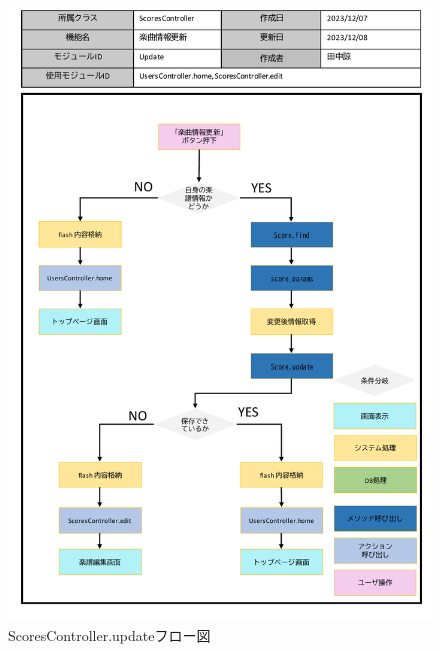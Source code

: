\begin{figure}
    \centering
    \includegraphics[scale=0.7]{img/Scores/pptx/ScoresController_update.pdf}
    \caption{ScoresController.updateフロー図}
\end{figure}

